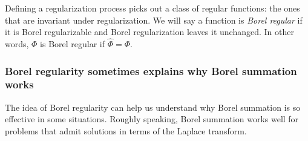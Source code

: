 \documentclass[10pt,a4paper]{amsart}
\numberwithin{equation}{section}
\begin{document}
Defining a regularization process picks out a class of regular functions: the ones that are invariant under regularization. We will say a function is {\em Borel regular} if it is Borel regularizable and Borel regularization leaves it unchanged. In other words, $\Phi$ is Borel regular if $\hat{\Phi} = \Phi$.

\subsubsection{Borel regularity sometimes explains why Borel summation works}\label{borel-reg:explanatory-power}
The idea of Borel regularity can help us understand why Borel summation is so effective in some situations. Roughly speaking, Borel summation works well for problems that admit solutions in terms of the Laplace transform.
\end{document}
